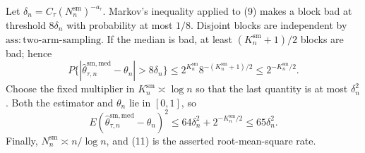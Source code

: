 Let \(\delta_n=C_\tau(N_n^{\mathrm{sm}})^{-a_\tau}\). Markov's inequality applied to (9) makes a block bad at threshold \(8\delta_n\) with probability at most \(1/8\). Disjoint blocks are independent by \(\mathrm{ass{:}two\text{-}arm\text{-}sampling}\). If the median is bad, at least \((K_n^{\mathrm{sm}}+1)/2\) blocks are bad; hence
\[
P\{|\widehat\theta^{\mathrm{sm,med}}_{\tau,n}-\theta_n|>8\delta_n\}
\le2^{K_n^{\mathrm{sm}}}8^{-(K_n^{\mathrm{sm}}+1)/2}
\le2^{-K_n^{\mathrm{sm}}/2}.                                      \tag{10}
\]
Choose the fixed multiplier in \(K_n^{\mathrm{sm}}\asymp\log n\) so that the last quantity is at most \(\delta_n^2\). Both the estimator and \(\theta_n\) lie in \([0,1]\), so
\[
E(\widehat\theta^{\mathrm{sm,med}}_{\tau,n}-\theta_n)^2
\le64\delta_n^2+2^{-K_n^{\mathrm{sm}}/2}
\le65\delta_n^2.                                                   \tag{11}
\]
Finally, \(N_n^{\mathrm{sm}}\asymp n/\log n\), and (11) is the asserted root-mean-square rate.